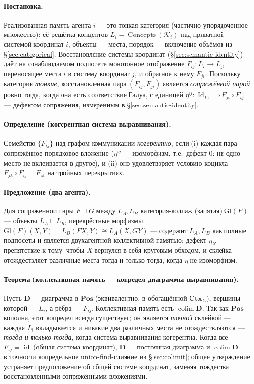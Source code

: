 \documentclass{article}
\begin{document}
\paragraph{Постановка.} Реализованная память агента $i$ --- это тонкая
категория (частично упорядоченное множество): её решётка концептов
$L_i=\operatorname{Concepts}(\mathcal{K}_i)$ над приватной системой координат
$i$, объекты --- места, порядок --- включение объёмов из
\S\ref{sec:categorical}. Восстановление системы координат
(\S\ref{sec:semantic-identity}) даёт на сонаблюдаемом подпосете монотонное
отображение $F_{ij}:L_i\to L_j$, переносящее места $i$ в систему координат
$j$, и обратное к нему $F_{ji}$. Поскольку категории \emph{тонкие},
восстановленная пара $(F_{ij},F_{ji})$ является \emph{сопряжённой парой} ровно
тогда, когда она есть соответствие Галуа, с единицей
$\eta^{ij}:\operatorname{Id}_{L_i}\Rightarrow F_{ji}\!\circ\!F_{ij}$ ---
дефектом сопряжения, измеренным в \S\ref{sec:semantic-identity}.

\paragraph{Определение (когерентная система выравнивания).} Семейство
$\{F_{ij}\}$ над графом коммуникации \emph{когерентно}, если (i) каждая пара
--- сопряжённое порядковое вложение ($\eta^{ij}$ --- изоморфизм, т.е.\ дефект
$0$: ни одно место не вклеивается в другое), и (ii) оно удовлетворяет условию
коцикла $F_{jk}\!\circ\!F_{ij}=F_{ik}$ на тройных перекрытиях.

\paragraph{Предложение (два агента).} Для сопряжённой пары $F\dashv G$ между
$L_A,L_B$ категория-коллаж (запятая) $\mathrm{Gl}(F)$ --- объекты
$L_A\sqcup L_B$, перекрёстные морфизмы $\mathrm{Gl}(F)(X,Y)=L_B(FX,Y)\cong L_A(X,GY)$
\citep{maclane1998categories} --- содержит $L_A,L_B$ как полные подпосеты и
является двухагентной коллективной памятью; дефект $\eta_X$ --- препятствие к
тому, чтобы $X$ вернулся в себя круговым обходом, и склейка отождествляет
различные места тогда и только тогда, когда $\eta$ не изоморфизм.

\paragraph{Теорема (коллективная память = копредел диаграммы выравнивания).}
Пусть $\mathbf{D}$ --- диаграмма в $\mathbf{Pos}$ (эквивалентно, в обогащённой
$\mathbf{Ctx}_\Sigma$), вершины которой --- $L_i$, а рёбра --- $F_{ij}$.
Коллективная память есть $\operatorname{colim}\mathbf{D}$. Так как
$\mathbf{Pos}$ кополна, этот копредел всегда существует; он является
\emph{точной} склейкой --- каждая $L_i$ вкладывается и никакие два различных
места не отождествляются --- \emph{тогда и только тогда}, когда система
выравнивания когерентна. Когда все $F_{ij}=\operatorname{id}$ (общая система
координат), $\mathbf{D}$ --- постоянная диаграмма и
$\operatorname{colim}\mathbf{D}$ --- в точности копредельное union-find-слияние
из \S\ref{sec:colimit}; общее утверждение устраняет предположение об общей
системе координат, заменяя тождества восстановленными сопряжёнными вложениями.
\end{document}
